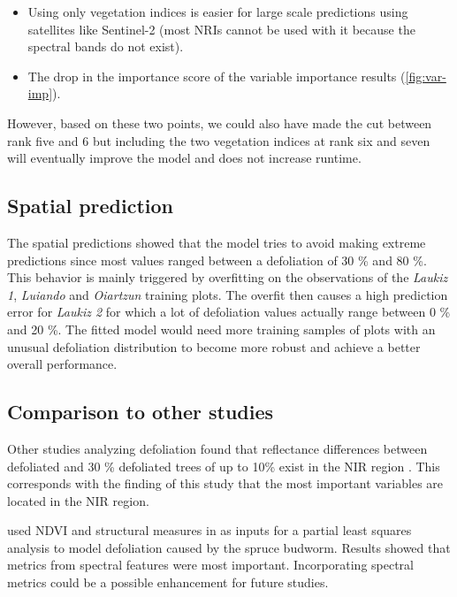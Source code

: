 \documentclass[review]{elsarticle}
\begin{document}
\begin{itemize}
	\item Using only vegetation indices is easier for large scale predictions using satellites like Sentinel-2 (most NRIs cannot be used with it because the spectral bands do not exist).
	\item The drop in the importance score of the variable importance results (\autoref{fig:var-imp}).
\end{itemize}

\noindent However, based on these two points, we could also have made the cut between rank five and 6 but including the two vegetation indices at rank six and seven will eventually improve the model and does not increase runtime.

\subsection{Spatial prediction}

\noindent The spatial predictions showed that the model tries to avoid making extreme predictions since most values ranged between a defoliation of 30 \% and 80 \%.
This behavior is mainly triggered by overfitting on the observations of the \textit{Laukiz 1}, \textit{Luiando} and \textit{Oiartzun} training plots.
The overfit then causes a high prediction error for \textit{Laukiz 2} for which a lot of defoliation values actually range between 0 \% and 20 \%.
The fitted model would need more training samples of plots with an unusual defoliation distribution to become more robust and achieve a better overall performance.

\subsection{Comparison to other studies}

\noindent Other studies analyzing defoliation found that reflectance differences between defoliated and 30 \% defoliated trees of up to 10\% exist in the \ac{NIR} region \citep{rengarajanModelingForestDefoliation2016}.
This corresponds with the finding of this study that the most important variables are located in the NIR region.

\cite{goodbodyDigitalAerialPhotogrammetry2018} used NDVI and structural measures in as inputs for a partial least squares analysis to model defoliation caused by the spruce budworm.
Results showed that metrics from spectral features were most important.
Incorporating spectral metrics could be a possible enhancement for future studies.
\end{document}

